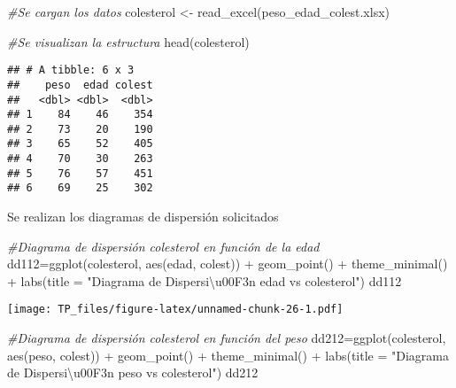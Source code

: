 \documentclass[
]{article}
\newenvironment{Shaded}{\begin{snugshade}}{\end{snugshade}}
\newcommand{\AttributeTok}[1]{\textcolor[rgb]{0.77,0.63,0.00}{#1}}
\newcommand{\CommentTok}[1]{\textcolor[rgb]{0.56,0.35,0.01}{\textit{#1}}}
\newcommand{\FunctionTok}[1]{\textcolor[rgb]{0.00,0.00,0.00}{#1}}
\newcommand{\NormalTok}[1]{#1}
\newcommand{\OtherTok}[1]{\textcolor[rgb]{0.56,0.35,0.01}{#1}}
\newcommand{\SpecialCharTok}[1]{\textcolor[rgb]{0.00,0.00,0.00}{#1}}
\newcommand{\StringTok}[1]{\textcolor[rgb]{0.31,0.60,0.02}{#1}}
\begin{document}
\begin{Shaded}
\begin{Highlighting}[]
\CommentTok{\#Se cargan los datos}
\NormalTok{colesterol }\OtherTok{\textless{}{-}} \FunctionTok{read\_excel}\NormalTok{(}\StringTok{\textquotesingle{}peso\_edad\_colest.xlsx\textquotesingle{}}\NormalTok{)}

\CommentTok{\#Se visualizan la estructura}
\FunctionTok{head}\NormalTok{(colesterol)}
\end{Highlighting}
\end{Shaded}

\begin{verbatim}
## # A tibble: 6 x 3
##    peso  edad colest
##   <dbl> <dbl>  <dbl>
## 1    84    46    354
## 2    73    20    190
## 3    65    52    405
## 4    70    30    263
## 5    76    57    451
## 6    69    25    302
\end{verbatim}

Se realizan los diagramas de dispersión solicitados

\begin{Shaded}
\begin{Highlighting}[]
\CommentTok{\#Diagrama de dispersión colesterol en función de la edad}
\NormalTok{dd112}\OtherTok{=}\FunctionTok{ggplot}\NormalTok{(colesterol, }\FunctionTok{aes}\NormalTok{(edad, colest)) }\SpecialCharTok{+} 
  \FunctionTok{geom\_point}\NormalTok{() }\SpecialCharTok{+} \FunctionTok{theme\_minimal}\NormalTok{() }\SpecialCharTok{+} \FunctionTok{labs}\NormalTok{(}\AttributeTok{title =} \StringTok{"Diagrama de Dispersi\textbackslash{}u00F3n edad vs colesterol"}\NormalTok{)}
\NormalTok{dd112}
\end{Highlighting}
\end{Shaded}

\texttt{[image: TP\_files/figure-latex/unnamed-chunk-26-1.pdf]}

\begin{Shaded}
\begin{Highlighting}[]
\CommentTok{\#Diagrama de dispersión colesterol en función del peso}
\NormalTok{dd212}\OtherTok{=}\FunctionTok{ggplot}\NormalTok{(colesterol, }\FunctionTok{aes}\NormalTok{(peso, colest)) }\SpecialCharTok{+} 
  \FunctionTok{geom\_point}\NormalTok{() }\SpecialCharTok{+} \FunctionTok{theme\_minimal}\NormalTok{() }\SpecialCharTok{+} \FunctionTok{labs}\NormalTok{(}\AttributeTok{title =} \StringTok{"Diagrama de Dispersi\textbackslash{}u00F3n peso vs colesterol"}\NormalTok{)}
\NormalTok{dd212}
\end{Highlighting}
\end{Shaded}
\end{document}
